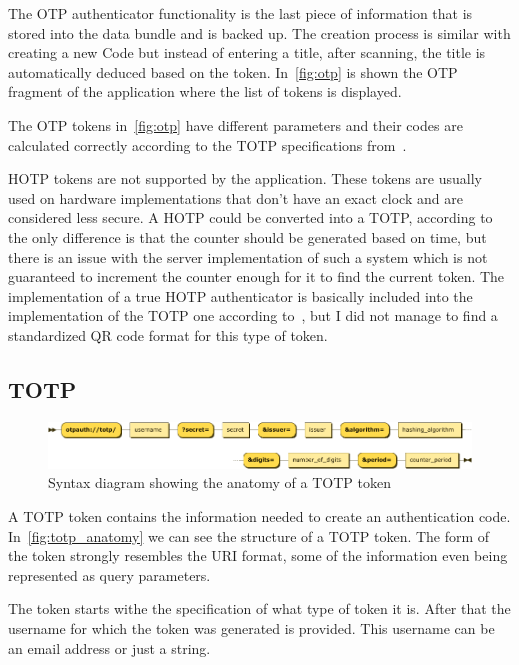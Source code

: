 \documentclass[a4paper,12pt]{report}
\begin{document}
The OTP authenticator functionality is the last piece of information that is
stored into the data bundle and is backed up. The creation process is similar
with creating a new Code but instead of entering a title, after scanning, the
title is automatically deduced based on the token. In~\autoref{fig:otp} is
shown the OTP fragment of the application where the list of tokens is
displayed.

The OTP tokens in~\autoref{fig:otp} have different parameters and their codes
are calculated correctly according to the TOTP specifications from~\cite{totp}.

HOTP tokens are not supported by the application. These tokens are usually used
on hardware implementations that don't have an exact clock and are considered
less secure. A HOTP could be converted into a TOTP, according to~\cite{totp}
the only difference is that the counter should be generated based on time, but
there is an issue with the server implementation of such a system which is not
guaranteed to increment the counter enough for it to find the current token.
The implementation of a true HOTP authenticator is basically included into the
implementation of the TOTP one according to~\cite{totp}, but I did not manage
to find a standardized QR code format for this type of token.

\subsection{TOTP}

\begin{figure}[H]
    \centering
    \includegraphics[scale=0.69]{diagrams/syntax/TOTP.png}
    \caption{Syntax diagram showing the anatomy of a TOTP token}\label{fig:totp_anatomy}
\end{figure}

A TOTP token contains the information needed to create an authentication code.
In~\autoref{fig:totp_anatomy} we can see the structure of a TOTP token. The
form of the token strongly resembles the URI format, some of the information
even being represented as query parameters.

The token starts withe the specification of what type of token it is. After
that the username for which the token was generated is provided. This username
can be an email address or just a string.
\end{document}
